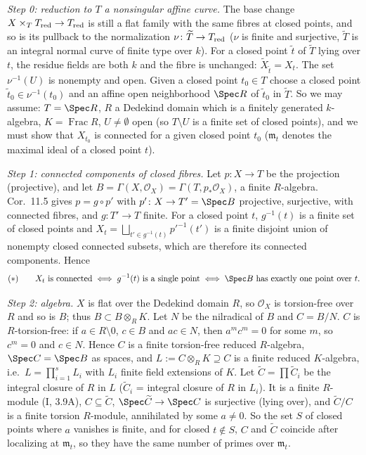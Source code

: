 \documentclass[11pt]{article}
\begin{document}
\emph{Step 0: reduction to $T$ a nonsingular affine curve.} The base change $X\times_T T_{\rm red}\to T_{\rm red}$ is still a flat family with the same fibres at closed points, and so is its pullback to the normalization $\nu\colon\widetilde T\to T_{\rm red}$ ($\nu$ is finite and surjective, $\widetilde T$ is an integral normal curve of finite type over $k$). For a closed point $\tilde t$ of $\widetilde T$ lying over $t$, the residue fields are both $k$ and the fibre is unchanged: $\widetilde X_{\tilde t}=X_t$. The set $\nu^{-1}(U)$ is nonempty and open. Given a closed point $t_0\in T$ choose a closed point $\tilde t_0\in\nu^{-1}(t_0)$ and an affine open neighborhood $\Spec R$ of $\tilde t_0$ in $\widetilde T$. So we may assume: $T=\Spec R$, $R$ a Dedekind domain which is a finitely generated $k$-algebra, $K=\operatorname{Frac}R$, $U\ne\emptyset$ open (so $T\setminus U$ is a finite set of closed points), and we must show that $X_{t_0}$ is connected for a given closed point $t_0$ ($\mathfrak m_t$ denotes the maximal ideal of a closed point $t$).

\emph{Step 1: connected components of closed fibres.} Let $p\colon X\to T$ be the projection (projective), and let $B=\Gamma(X,\mathcal O_X)=\Gamma(T,p_*\mathcal O_X)$, a finite $R$-algebra. Cor.~11.5 gives $p=g\circ p'$ with $p'\colon X\to T'=\Spec B$ projective, surjective, with connected fibres, and $g\colon T'\to T$ finite. For a closed point $t$, $g^{-1}(t)$ is a finite set of closed points and $X_t=\bigsqcup_{t'\in g^{-1}(t)}p'^{-1}(t')$ is a finite disjoint union of nonempty closed connected subsets, which are therefore its connected components. Hence
\[
(*)\qquad X_t\text{ is connected}\iff g^{-1}(t)\text{ is a single point}\iff \Spec B\text{ has exactly one point over }t .
\]

\emph{Step 2: algebra.} $X$ is flat over the Dedekind domain $R$, so $\mathcal O_X$ is torsion-free over $R$ and so is $B$; thus $B\subset B\otimes_RK$. Let $N$ be the nilradical of $B$ and $C=B/N$. $C$ is $R$-torsion-free: if $a\in R\setminus0$, $c\in B$ and $ac\in N$, then $a^mc^m=0$ for some $m$, so $c^m=0$ and $c\in N$. Hence $C$ is a finite torsion-free reduced $R$-algebra, $\Spec C=\Spec B$ as spaces, and $L:=C\otimes_RK\supseteq C$ is a finite reduced $K$-algebra, i.e.\ $L=\prod_{i=1}^sL_i$ with $L_i$ finite field extensions of $K$. Let $\widetilde C=\prod\widetilde C_i$ be the integral closure of $R$ in $L$ ($\widetilde C_i$ = integral closure of $R$ in $L_i$). It is a finite $R$-module (I, 3.9A), $C\subseteq\widetilde C$, $\Spec\widetilde C\to\Spec C$ is surjective (lying over), and $\widetilde C/C$ is a finite torsion $R$-module, annihilated by some $a\ne0$. So the set $S$ of closed points where $a$ vanishes is finite, and for closed $t\notin S$, $C$ and $\widetilde C$ coincide after localizing at $\mathfrak m_t$, so they have the same number of primes over $\mathfrak m_t$.
\end{document}
